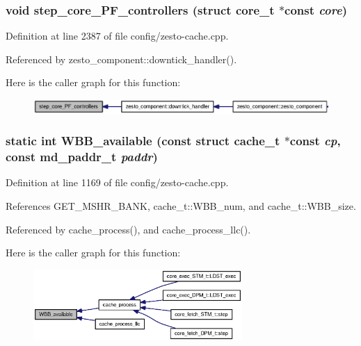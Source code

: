 \subsubsection[{step\_\-core\_\-PF\_\-controllers}]{\setlength{\rightskip}{0pt plus 5cm}void step\_\-core\_\-PF\_\-controllers (struct {\bf core\_\-t} $\ast$const  {\em core})}\label{config_2zesto-cache_8cpp_66309167ab5b4ca25ad2bfbf94b0126b}




Definition at line 2387 of file config/zesto-cache.cpp.

Referenced by zesto\_\-component::downtick\_\-handler().

Here is the caller graph for this function:\nopagebreak
\begin{figure}[H]
\begin{center}
\leavevmode
\includegraphics[width=335pt]{config_2zesto-cache_8cpp_66309167ab5b4ca25ad2bfbf94b0126b_icgraph}
\end{center}
\end{figure}
\subsubsection[{WBB\_\-available}]{\setlength{\rightskip}{0pt plus 5cm}static int WBB\_\-available (const struct {\bf cache\_\-t} $\ast$const  {\em cp}, \/  const {\bf md\_\-paddr\_\-t} {\em paddr})\hspace{0.3cm}{\tt  [inline, static]}}\label{config_2zesto-cache_8cpp_48f8188c331e3c2188868d0f1c577d5a}




Definition at line 1169 of file config/zesto-cache.cpp.

References GET\_\-MSHR\_\-BANK, cache\_\-t::WBB\_\-num, and cache\_\-t::WBB\_\-size.

Referenced by cache\_\-process(), and cache\_\-process\_\-llc().

Here is the caller graph for this function:\nopagebreak
\begin{figure}[H]
\begin{center}
\leavevmode
\includegraphics[width=225pt]{config_2zesto-cache_8cpp_48f8188c331e3c2188868d0f1c577d5a_icgraph}
\end{center}
\end{figure}
